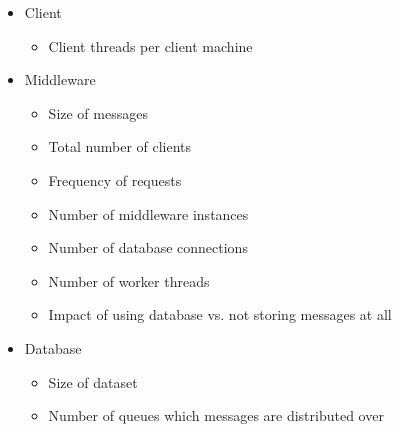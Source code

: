 \documentclass{article}
\begin{document}
        \begin{itemize}
            \item Client
            \begin{itemize}
                \item Client threads per client machine
            \end{itemize}
            \item Middleware
            \begin{itemize}
                \item Size of messages
                \item Total number of clients
                \item Frequency of requests
                \item Number of middleware instances
                \item Number of database connections
                \item Number of worker threads
                \item Impact of using database vs. not storing messages at all
            \end{itemize}
            \item Database
            \begin{itemize}
                \item Size of dataset
                \item Number of queues which messages are distributed over
            \end{itemize}
        \end{itemize}
\end{document}
